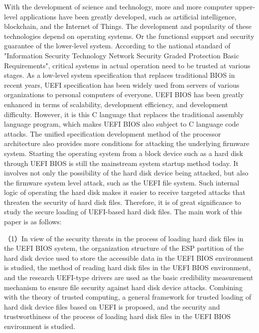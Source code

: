 \begin{eabstract}

With the development of science and technology, more and more computer upper-level applications 
have been greatly developed, such as artificial intelligence, blockchain, and the Internet of Things. 
The development and popularity of these technologies depend on operating systems. Or the functional 
support and security guarantee of the lower-level system. According to the national standard of 
"Information Security Technology Network Security Graded Protection Basic Requirements", critical 
systems in actual operation need to be trusted at various stages. As a low-level system specification 
that replaces traditional BIOS in recent years, UEFI specification has been widely used from servers 
of various organizations to personal computers of everyone. UEFI BIOS has been greatly enhanced in 
terms of scalability, development efficiency, and development difficulty. However, it is this C 
language that replaces the traditional assembly language program, which makes UEFI BIOS also subject 
to C language code attacks. The unified specification development method of the processor 
architecture also provides more conditions for attacking the underlying firmware system. 
Starting the operating system from a block device such as a hard disk through UEFI BIOS is 
still the mainstream system startup method today. It involves not only the possibility of the 
hard disk device being attacked, but also the firmware system level attack, such as the UEFI 
file system. Such internal logic of operating the hard disk makes it easier to receive 
targeted attacks that threaten the security of hard disk files. Therefore, it is of great 
significance to study the secure loading of UEFI-based hard disk files. The main work of this 
paper is as follows:
\par （1）In view of the security threats in the process of loading hard disk files in the UEFI 
BIOS system, the organization structure of the ESP partition of the hard disk device used to store 
the accessible data in the UEFI BIOS environment is studied, the method of reading hard disk files 
in the UEFI BIOS environment, and the research UEFI-type drivers are used as the basic credibility 
measurement mechanism to ensure file security against hard disk device attacks. Combining with 
the theory of trusted computing, a general framework for trusted loading of hard disk device files 
based on UEFI is proposed, and the security and trustworthiness of the process of loading hard 
disk files in the UEFI BIOS environment is studied.

\end{eabstract}

